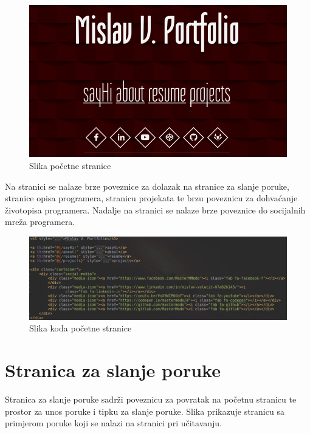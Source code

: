 \documentclass[times, utf8, zavrsni, numeric]{fer}
\begin{document}
\begin{figure}[htb]
				\centering
				\includegraphics[width=14.6cm]{images/front-page.png}
				\caption{Slika početne stranice}
				\label{fig:front-page}
\end{figure}

Na stranici se nalaze brze poveznice za dolazak na stranice za slanje poruke, stranice opisa programera, stranicu projekata te brzu poveznicu za dohvaćanje životopisa programera. Nadalje na stranici se nalaze brze poveznice do socijalnih mreža programera.

\begin{figure}[htb]
				\centering
				\includegraphics[width=14.6cm]{images/start-page.png}
				\caption{Slika koda početne stranice}
				\label{fig:start-page}
\end{figure}

\section{Stranica za slanje poruke}
\qquad Stranica za slanje poruke sadrži poveznicu za povratak na početnu stranicu te prostor za unos poruke i tipku za slanje poruke. Slika prikazuje stranicu sa primjerom poruke koji se nalazi na stranici pri učitavanju.
\end{document}
